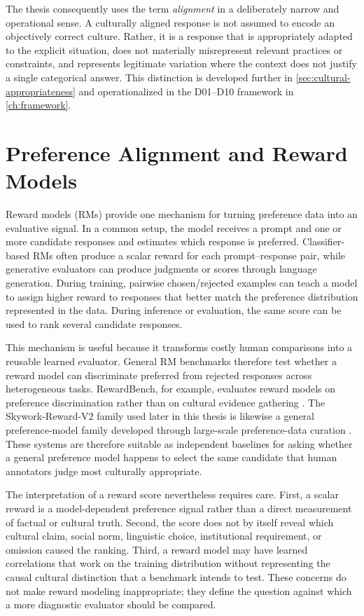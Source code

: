 The thesis consequently uses the term \emph{alignment} in a deliberately narrow and operational sense. A culturally aligned response is not assumed to encode an objectively correct culture. Rather, it is a response that is appropriately adapted to the explicit situation, does not materially misrepresent relevant practices or constraints, and represents legitimate variation where the context does not justify a single categorical answer. This distinction is developed further in \cref{sec:cultural-appropriateness} and operationalized in the D01--D10 framework in \cref{ch:framework}.

\section{Preference Alignment and Reward Models}
\label{sec:background-rm}

Reward models (RMs) provide one mechanism for turning preference data into an evaluative signal. In a common setup, the model receives a prompt and one or more candidate responses and estimates which response is preferred. Classifier-based RMs often produce a scalar reward for each prompt--response pair, while generative evaluators can produce judgments or scores through language generation. During training, pairwise chosen/rejected examples can teach a model to assign higher reward to responses that better match the preference distribution represented in the data. During inference or evaluation, the same score can be used to rank several candidate responses.

This mechanism is useful because it transforms costly human comparisons into a reusable learned evaluator. General RM benchmarks therefore test whether a reward model can discriminate preferred from rejected responses across heterogeneous tasks. RewardBench, for example, evaluates reward models on preference discrimination rather than on cultural evidence gathering \parencite{lambert2025rewardbench}. The Skywork-Reward-V2 family used later in this thesis is likewise a general preference-model family developed through large-scale preference-data curation \parencite{liu2026skyworkrewardv2}. These systems are therefore suitable as independent baselines for asking whether a general preference model happens to select the same candidate that human annotators judge most culturally appropriate.

The interpretation of a reward score nevertheless requires care. First, a scalar reward is a model-dependent preference signal rather than a direct measurement of factual or cultural truth. Second, the score does not by itself reveal which cultural claim, social norm, linguistic choice, institutional requirement, or omission caused the ranking. Third, a reward model may have learned correlations that work on the training distribution without representing the causal cultural distinction that a benchmark intends to test. These concerns do not make reward modeling inappropriate; they define the question against which a more diagnostic evaluator should be compared.

